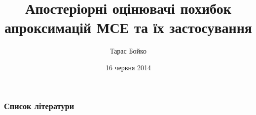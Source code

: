 \documentclass[12pt]{beamer}
\title[Апостеріорні оцінювачі похибок МСЕ]{Апостеріорні оцінювачі похибок апроксимацій МСЕ та їх застосування}
\author{Тарас Бойко}
\date{16 червня 2014}
\begin{document}
	

	
	
	
	
	



	\begin{frame}[allowframebreaks]
		\frametitle<presentation>{Список літератури}
		\nocite{*}
		\printbibliography
	\end{frame}
\end{document}
